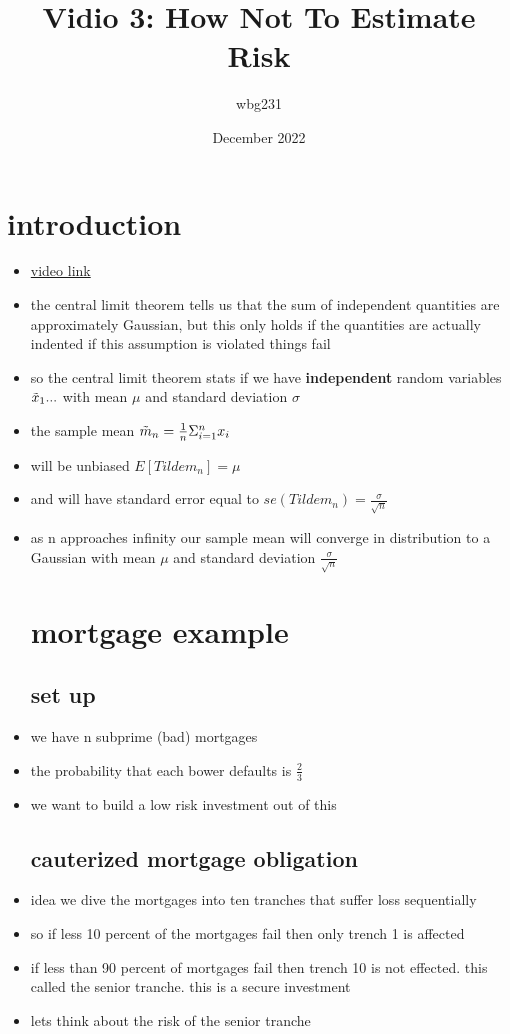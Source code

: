 \documentclass{article}
\title{Vidio 3: How Not To Estimate Risk}
\author{wbg231 }
\date{December 2022}
\begin{document}
\maketitle

\section{introduction}
\begin{itemize}
\item \href{https://www.youtube.com/watch?v=p_QTXkKod4k&list=PLBEf5mJtE6KuZ5NBQMuWIMsiOOrV9ibzm&index=72}{video link}
\item the central limit theorem tells us that the sum of independent quantities are approximately Gaussian, but this only holds if the quantities are actually indented if this assumption is violated things fail 
\item so the central limit theorem stats if we have \textbf{independent} random variables $\Tilde{x}_1...$ with mean $\mu$ and standard deviation $\sigma$
\item the sample mean $\Tilde{m}_{n}=\frac{1}{n}\Sigma_{i=1}^{n}x_i$
\item will be unbiased $E[Tilde{m}_{n}]=\mu$
\item and will have standard error equal to $se(Tilde{m}_{n})=\frac{\sigma}{\sqrt{n}}$
\item as n approaches infinity our sample mean will converge in distribution to a Gaussian with mean $\mu$ and standard deviation $\frac{\sigma}{\sqrt{n}}$
\section{mortgage example}
\subsection{set up}
\item we have n subprime (bad) mortgages 
\item the probability that each bower defaults is $\frac{2}{3}$
\item we want to build a low risk investment out of this 
\subsection{cauterized mortgage obligation}
\item idea we dive the mortgages into ten tranches that suffer loss sequentially
\item so if less 10 percent of the mortgages fail then only trench 1 is affected 
\item if less than 90 percent of mortgages fail then trench 10 is not effected. this called the senior tranche. this is a secure investment 
\item lets think about the risk of the senior tranche

\end{itemize}
\end{document}
